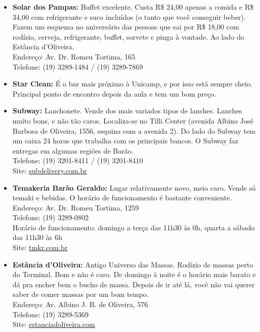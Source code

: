 \begin{itemize}
    \item   \textbf{Solar dos Pampas:} Buffet excelente. Custa R\$ 24,00 apenas
        a comida e R\$ 34,00 com refrigerante e suco incluídos (o tanto que você
        conseguir beber). Fazem um esquema no aniversário das pessoas que sai
        por R\$ 18,00 com rodízio, cerveja, refrigerante, buffet, sorvete e
        pinga à vontade. Ao lado do Estância d'Oliveira.
        \\Endereço: Av. Dr. Romeu Tortima, 165
        \\Telefone: (19) 3289-1484 / (19) 3289-7869

    \item   \textbf{Star Clean:} É o bar mais próximo à Unicamp, e por isso está
        sempre cheio. Principal ponto de encontro depois da aula e tem um bom
        preço.

    \item   \textbf{Subway:} Lanchonete. Vende dos mais variados tipos de
        lanches.  Lanches muito bons, e não tão caros. Localiza-se no Tilli
        Center (avenida Albino José Barbosa de Oliveira, 1556, esquina com a
        avenida 2). Do lado do Subway tem um caixa 24 horas que trabalha com os
        principais bancos. O Subway faz entregas em algumas regiões de Barão.
        \\Telefone: (19) 3201-8411 / (19) 3201-8410
        \\Site: \url{subdelivery.com.br}

      \item \textbf{Temakeria Barão Geraldo:} Lugar relativamente novo, meio
        caro. Vende só temaki e bebidas. O horário de funcionamento é bastante
        conveniente.
        \\Endereço: Av. Dr. Romeu Tortima, 1259
        \\Telefone: (19) 3289-0802
        \\Horário de funcionamento: domingo a terça das 11h30 às 0h, quarta a
        sábado das 11h30 às 6h
        \\Site: \url{tmkr.com.br}

    \item   \textbf{Estância d'Oliveira:} Antigo Universo das Massas. Rodízio de
        massas perto do Terminal. Bom e não é caro. De domingo à noite é o
        horário mais barato e dá pra encher bem o bucho de massa. Depois de ir
        até lá, você não vai querer saber de comer massas por um bom tempo.
        \\Endereço: Av. Albino J. B. de Oliveira, 576
        \\Telefone: (19) 3289-5369
        \\Site: \url{estanciadoliveira.com}


\end{itemize}
